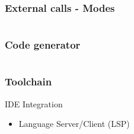 \documentclass{beamer}
\begin{document}
\begin{frame}
\frametitle{External calls - Modes}
\inputminted[fontsize=\small]{swift}{code/modes.flint}
\end{frame}









\begin{frame}
\frametitle{Code generator}
\inputminted[fontsize=\tiny]{swift}{code/codegen.flint}
\end{frame}

\begin{frame}
\frametitle{Toolchain}
\begin{block}{IDE Integration}
	{\tiny
	\begin{itemize}
		\item Language Server/Client (LSP)
	\end{itemize}
	}
\end{block}
\end{frame}
\end{document}
